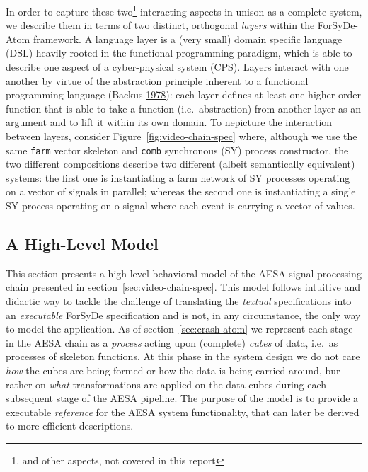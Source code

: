 \documentclass[
  a4paper,
]{article}
\begin{document}
In order to capture these two\footnote{and other aspects, not covered in
  this report} interacting aspects in unison as a complete system, we
describe them in terms of two distinct, orthogonal \emph{layers} within
the ForSyDe-Atom framework. A language layer is a (very small) domain
specific language (DSL) heavily rooted in the functional programming
paradigm, which is able to describe one aspect of a cyber-physical
system (CPS). Layers interact with one another by virtue of the
abstraction principle inherent to a functional programming language
(Backus \protect\hyperlink{ref-backus-1978}{1978}): each layer defines
at least one higher order function that is able to take a function
(i.e.~abstraction) from another layer as an argument and to lift it
within its own domain. To nepicture the interaction between layers,
consider Figure~\ref{fig:video-chain-spec} where, although we use the
same \texttt{farm} vector skeleton and \texttt{comb} synchronous (SY)
process constructor, the two different compositions describe two
different (albeit semantically equivalent) systems: the first one is
instantiating a farm network of SY processes operating on a vector of
signals in parallel; whereas the second one is instantiating a single SY
process operating on o signal where each event is carrying a vector of
values.

\hypertarget{sec:cube-atom-operation}{%
\subsection{A High-Level Model}\label{sec:cube-atom-operation}}

This section presents a high-level behavioral model of the AESA signal
processing chain presented in section~\ref{sec:video-chain-spec}. This
model follows intuitive and didactic way to tackle the challenge of
translating the \emph{textual} specifications into an \emph{executable}
ForSyDe specification and is not, in any circumstance, the only way to
model the application. As of section~\ref{sec:crash-atom} we represent
each stage in the AESA chain as a \emph{process} acting upon (complete)
\emph{cubes} of data, i.e.~as processes of skeleton functions. At this
phase in the system design we do not care \emph{how} the cubes are being
formed or how the data is being carried around, bur rather on
\emph{what} transformations are applied on the data cubes during each
subsequent stage of the AESA pipeline. The purpose of the model is to
provide a executable \emph{reference} for the AESA system functionality,
that can later be derived to more efficient descriptions.
\end{document}
